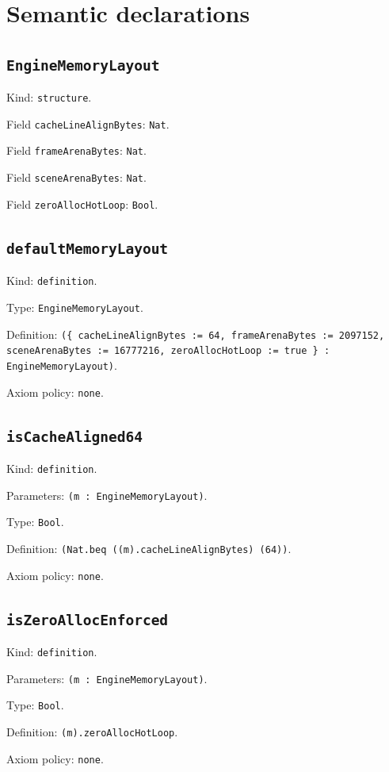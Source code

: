\documentclass[11pt]{article}
\begin{document}
\section*{Semantic declarations}
\subsection*{\texttt{EngineMemoryLayout}}
\noindent Kind: \texttt{structure}.\par
\noindent Field \texttt{cacheLineAlignBytes}: \texttt{Nat}.\par
\noindent Field \texttt{frameArenaBytes}: \texttt{Nat}.\par
\noindent Field \texttt{sceneArenaBytes}: \texttt{Nat}.\par
\noindent Field \texttt{zeroAllocHotLoop}: \texttt{Bool}.\par
\subsection*{\texttt{defaultMemoryLayout}}
\noindent Kind: \texttt{definition}.\par
\noindent Type: \texttt{EngineMemoryLayout}.\par
\noindent Definition: \texttt{(\{ cacheLineAlignBytes := 64, frameArenaBytes := 2097152, sceneArenaBytes := 16777216, zeroAllocHotLoop := true \} : EngineMemoryLayout)}.\par
\noindent Axiom policy: \texttt{none}.\par
\subsection*{\texttt{isCacheAligned64}}
\noindent Kind: \texttt{definition}.\par
\noindent Parameters: \texttt{(m : EngineMemoryLayout)}.\par
\noindent Type: \texttt{Bool}.\par
\noindent Definition: \texttt{(Nat.beq ((m).cacheLineAlignBytes) (64))}.\par
\noindent Axiom policy: \texttt{none}.\par
\subsection*{\texttt{isZeroAllocEnforced}}
\noindent Kind: \texttt{definition}.\par
\noindent Parameters: \texttt{(m : EngineMemoryLayout)}.\par
\noindent Type: \texttt{Bool}.\par
\noindent Definition: \texttt{(m).zeroAllocHotLoop}.\par
\noindent Axiom policy: \texttt{none}.\par
\end{document}
